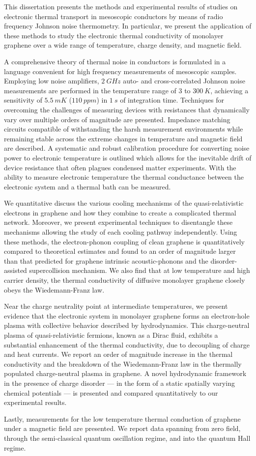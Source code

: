 This dissertation presents the methods and experimental results of studies on electronic thermal transport in mesoscopic conductors by means of radio frequency Johnson noise thermometry. In particular, we present the application of these methods to study the electronic thermal conductivity of monolayer graphene over a wide range of temperature, charge density, and magnetic field.

A comprehensive theory of thermal noise in conductors is formulated in a language convenient for high frequency measurements of mesoscopic samples. Employing low noise amplifiers, $2~GHz$ auto- and cross-correlated Johnson noise measurements are performed in the temperature range of $3$ to $300~K$, achieving a sensitivity of $5.5~mK$ ($110~ppm$) in $1~s$ of integration time. Techniques for overcoming the challenges of measuring devices with resistances that dynamically vary over multiple orders of magnitude are presented. Impedance matching circuits compatible of withstanding the harsh measurement environments while remaining stable across the extreme changes in temperature and magnetic field are described. A systematic and robust calibration procedure for converting noise power to electronic temperature is outlined which allows for the inevitable drift of device resistance that often plagues condensed matter experiments. With the ability to measure electronic temperature the thermal conductance between the electronic system and a thermal bath can be measured. 

We quantitative discuss the various cooling mechanisms of the quasi-relativistic electrons in graphene and how they combine to create a complicated thermal network. Moreover, we present experimental techniques to disentangle these mechanisms allowing the study of each cooling pathway independently. Using these methods, the electron-phonon coupling of clean graphene is quantitatively compared to theoretical estimates and found to an order of magnitude larger than that predicted for graphene intrinsic acoustic-phonons and the disorder-assisted supercollision mechanism. We also find that at low temperature and high carrier density, the thermal conductivity of diffusive monolayer graphene closely obeys the Wiedemann-Franz law. 

Near the charge neutrality point at intermediate temperatures, we present evidence that the electronic system in monolayer graphene forms an electron-hole plasma with collective behavior described by hydrodynamics. This charge-neutral plasma of quasi-relativistic fermions, known as a Dirac fluid, exhibits a substantial enhancement of the thermal conductivity, due to decoupling of charge and heat currents. We report an order of magnitude increase in the thermal conductivity and the breakdown of the Wiedemann-Franz law in the thermally populated charge-neutral plasma in graphene. A novel hydrodynamic framework in the presence of charge disorder --- in the form of a static spatially varying chemical potentials --- is presented and compared quantitatively to our experimental results.

Lastly, measurements for the low temperature thermal conduction of graphene under a magnetic field are presented. We report data spanning from zero field, through the semi-classical quantum oscillation regime, and into the quantum Hall regime.